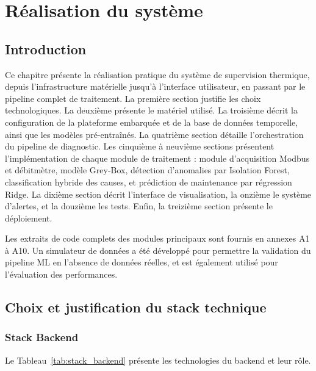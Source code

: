 \chapter{Réalisation du système}

\section*{Introduction}

Ce chapitre présente la réalisation pratique du système de supervision thermique, depuis l'infrastructure matérielle jusqu'à l'interface utilisateur, en passant par le pipeline complet de traitement. La première section justifie les choix technologiques. La deuxième présente le matériel utilisé. La troisième décrit la configuration de la plateforme embarquée et de la base de données temporelle, ainsi que les modèles pré-entraînés. La quatrième section détaille l'orchestration du pipeline de diagnostic. Les cinquième à neuvième sections présentent l'implémentation de chaque module de traitement : module d'acquisition Modbus et débitmètre, modèle Grey-Box, détection d'anomalies par Isolation Forest, classification hybride des causes, et prédiction de maintenance par régression Ridge. La dixième section décrit l'interface de visualisation, la onzième le système d'alertes, et la douzième les tests. Enfin, la treizième section présente le déploiement.

Les extraits de code complets des modules principaux sont fournis en annexes A1 à A10.
Un simulateur de données a été développé pour permettre la validation du pipeline ML en l'absence de données réelles, et est également utilisé pour l'évaluation des performances.

\section{Choix et justification du stack technique}

\subsection{Stack Backend}

Le Tableau~\ref{tab:stack_backend} présente les technologies du backend et leur rôle.

